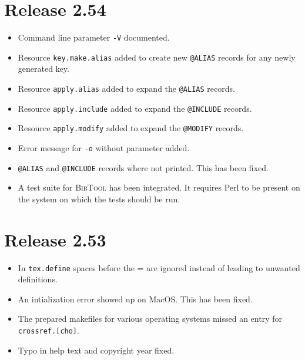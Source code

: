 \documentclass[11pt,a4paper]{scrartcl}
\newcommand\Arg[1]{\texttt{#1}}
\newcommand\rsc[1]{\texttt{#1}}
\newcommand\BibTool{\textsc{BibTool}}
\newenvironment{Release}[2]{\section*{Release #1}\begin{itemize}}{\end{itemize}}
\newenvironment{Fix}[1]{\item }{}
\newenvironment{New}[1]{\item }{}
\newenvironment{Update}[1]{\item }{}
\begin{document}
 \begin{Release}{2.54}{February 21, 2012}
  \begin{New}{gene}
    Command line parameter \Arg{-V} documented.
  \end{New}
  \begin{New}{gene}
    Resource \rsc{key.make.alias} added to create new \texttt{@ALIAS}
    records for any newly generated key.
  \end{New}
  \begin{New}{gene}
    Resource \rsc{apply.alias} added to expand the \texttt{@ALIAS}
    records.
  \end{New}
  \begin{New}{gene}
    Resource \rsc{apply.include} added to expand the \texttt{@INCLUDE}
    records.
  \end{New}
  \begin{New}{gene}
    Resource \rsc{apply.modify} added to expand the \texttt{@MODIFY}
    records.
  \end{New}
  \begin{Update}{gene}
    Error message for \Arg{-o} without parameter added.
  \end{Update}
  \begin{Fix}{gene}
    \texttt{@ALIAS} and \texttt{@INCLUDE} records where not printed.
    This has been fixed.
  \end{Fix}
  \begin{New}{gene}
    A test suite for \BibTool{} has been integrated. It requires Perl
    to be present on the system on which the tests should be run.
  \end{New}
 \end{Release}

 \begin{Release}{2.53}{September 25, 2011}
  \begin{Update}{gene}
    In \texttt{tex.define} spaces before the = are ignored instead of
    leading to unwanted definitions.
  \end{Update}
  \begin{Fix}{gene}
    An intialization error showed up on MacOS. This has been fixed.
  \end{Fix}
  \begin{Fix}{gene}
    The prepared makefiles for various operating systems missed an
    entry for \texttt{crossref.[cho]}.
  \end{Fix}
  \begin{Fix}{gene}
    Typo in help text and copyright year fixed.
  \end{Fix}
 \end{Release}
\end{document}

